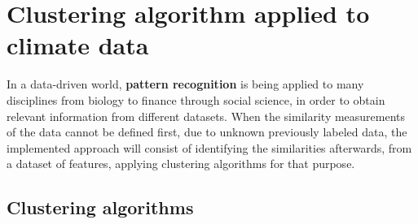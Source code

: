 \section{Clustering algorithm applied to climate data}




In a data-driven world, \textbf{pattern recognition} is being applied to many disciplines from biology to finance through social science, in order to obtain relevant information from different datasets.
When the similarity measurements of the data cannot be defined first, due to unknown previously labeled data, the implemented approach will consist of identifying the similarities afterwards, from a dataset of features, applying clustering algorithms for that purpose.

\subsection{Clustering algorithms}

